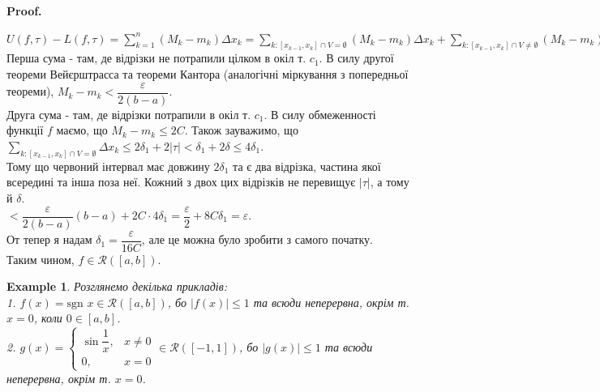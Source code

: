 \documentclass[a4paper, 10pt]{article}
\makeatletter
\def\huge{\displaystyle}
\def\qed{$\blacksquare$}
\theoremstyle{theoremdd}
\theoremstyle{theoremdd}
\theoremstyle{theoremdd}
\theoremstyle{theoremdd}
\theoremstyle{theoremdd}
\newtheorem{example}[theorem]{Example}
\theoremstyle{theoremdd}
\theoremstyle{theoremdd}
\theoremstyle{theoremdd}
\theoremstyle{theoremdd}
\renewenvironment{proof}[1][Proof.\\]{\par
\pushQED{\hfill \qed}%
\normalfont \topsep6\p@\@plus6\p@\relax
\trivlist
\item\relax
{\bfseries
#1\@addpunct{.}}\hspace\labelsep\ignorespaces
}{%
\popQED\endtrivlist\@endpefalse
}
\makeatother
\begin{document}
\begin{proof}
\begin{figure}[H]
\end{figure}
$U(f,\tau) - L(f,\tau) = \huge\sum_{k=1}^n (M_k-m_k) \Delta x_k = \huge\sum_{k:[x_{k-1},x_k] \cap V = \emptyset} (M_k - m_k) \Delta x_k + \sum_{k: [x_{k-1},x_{k}] \cap V \neq \emptyset} (M_k - m_k) \Delta x_k \boxed{<}$\\
Перша сума - там, де відрізки не потрапили цілком в окіл т. $c_1$. В силу другої теореми Вейєрштрасса та теореми Кантора (аналогічні міркування з попередньої теореми), $M_k - m_k < \dfrac{\varepsilon}{2(b-a)}$.\\
Друга сума - там, де відрізки потрапили в окіл т. $c_1$. В силу обмеженності функції $f$ маємо, що $M_k-m_k \leq 2C$. Також зауважимо, що $\huge\sum_{k:[x_{k-1},x_k] \cap V = \emptyset} \Delta x_k \leq 2 \delta_1 + 2 |\tau| <  \delta_1 + 2 \delta \leq 4\delta_1$.\\
Тому що червоний інтервал має довжину $2\delta_1$ та є два відрізка, частина якої всередині та інша поза неї. Кожний з двох цих відрізків не перевищує $|\tau|$, а тому й $\delta$.\\
$\boxed{<} \dfrac{\varepsilon}{2(b-a)} (b-a) + 2 C \cdot 4 \delta_1 = \dfrac{\varepsilon}{2} + 8C\delta_1 = \varepsilon$.\\
От тепер я надам $\delta_1 = \dfrac{\varepsilon}{16C}$, але це можна було зробити з самого початку.\\
Таким чином, $f \in \mathcal{R}([a,b])$.

\end{proof}

\begin{example}
Розглянемо декілька прикладів:\\
1. $f(x) = \text{sgn }x \in \mathcal{R}([a,b])$, бо $|f(x)| \leq 1$ та всюди неперервна, окрім т. $x = 0$, коли $0 \in [a,b]$.\\
2. $g(x) = \begin{cases} \sin \dfrac{1}{x}, & x \neq 0 \\ 0, & x = 0 \end{cases} \in \mathcal{R}([-1,1])$, бо $|g(x)| \leq 1$ та всюди неперервна, окрім т. $x = 0$.
\end{example}
\end{document}
